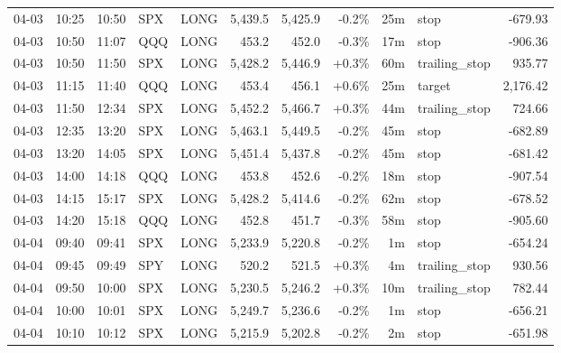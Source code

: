 \documentclass[11pt,a4paper,twoside]{article}
\begin{document}
\begin{center}
\begin{longtable}{>{\color{txtmain}}l l l l l r r r r >{\color{txtmain}}l r}
04-03 & 10:25 & 10:50 & SPX & LONG & 5,439.5 & 5,425.9 & \textcolor{lossred}{-0.2\%} & 25m & stop & \textcolor{lossred}{-679.93} \\
04-03 & 10:50 & 11:07 & QQQ & LONG & 453.2 & 452.0 & \textcolor{lossred}{-0.3\%} & 17m & stop & \textcolor{lossred}{-906.36} \\
04-03 & 10:50 & 11:50 & SPX & LONG & 5,428.2 & 5,446.9 & \textcolor{wingreen}{+0.3\%} & 60m & trailing\_stop & \textcolor{wingreen}{935.77} \\
04-03 & 11:15 & 11:40 & QQQ & LONG & 453.4 & 456.1 & \textcolor{wingreen}{+0.6\%} & 25m & target & \textcolor{wingreen}{2,176.42} \\
04-03 & 11:50 & 12:34 & SPX & LONG & 5,452.2 & 5,466.7 & \textcolor{wingreen}{+0.3\%} & 44m & trailing\_stop & \textcolor{wingreen}{724.66} \\
04-03 & 12:35 & 13:20 & SPX & LONG & 5,463.1 & 5,449.5 & \textcolor{lossred}{-0.2\%} & 45m & stop & \textcolor{lossred}{-682.89} \\
04-03 & 13:20 & 14:05 & SPX & LONG & 5,451.4 & 5,437.8 & \textcolor{lossred}{-0.2\%} & 45m & stop & \textcolor{lossred}{-681.42} \\
04-03 & 14:00 & 14:18 & QQQ & LONG & 453.8 & 452.6 & \textcolor{lossred}{-0.2\%} & 18m & stop & \textcolor{lossred}{-907.54} \\
04-03 & 14:15 & 15:17 & SPX & LONG & 5,428.2 & 5,414.6 & \textcolor{lossred}{-0.2\%} & 62m & stop & \textcolor{lossred}{-678.52} \\
04-03 & 14:20 & 15:18 & QQQ & LONG & 452.8 & 451.7 & \textcolor{lossred}{-0.3\%} & 58m & stop & \textcolor{lossred}{-905.60} \\
04-04 & 09:40 & 09:41 & SPX & LONG & 5,233.9 & 5,220.8 & \textcolor{lossred}{-0.2\%} & 1m & stop & \textcolor{lossred}{-654.24} \\
04-04 & 09:45 & 09:49 & SPY & LONG & 520.2 & 521.5 & \textcolor{wingreen}{+0.3\%} & 4m & trailing\_stop & \textcolor{wingreen}{930.56} \\
04-04 & 09:50 & 10:00 & SPX & LONG & 5,230.5 & 5,246.2 & \textcolor{wingreen}{+0.3\%} & 10m & trailing\_stop & \textcolor{wingreen}{782.44} \\
04-04 & 10:00 & 10:01 & SPX & LONG & 5,249.7 & 5,236.6 & \textcolor{lossred}{-0.2\%} & 1m & stop & \textcolor{lossred}{-656.21} \\
04-04 & 10:10 & 10:12 & SPX & LONG & 5,215.9 & 5,202.8 & \textcolor{lossred}{-0.2\%} & 2m & stop & \textcolor{lossred}{-651.98} \\

\end{longtable}
\end{center}
\end{document}
